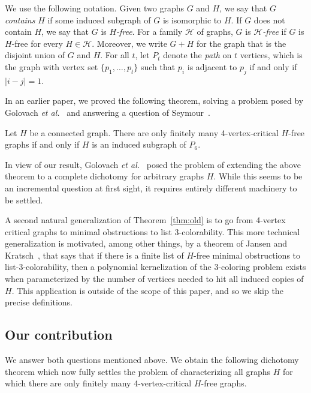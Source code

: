 \documentclass[11pt]{article}
\begin{document}
We use the following notation. Given two graphs $G$ and $H$, we say that
$G$ {\em contains} $H$ if some induced subgraph of $G$ is isomorphic to $H$.
If $G$ does not contain $H$, we say that $G$ is {\em $H$-free}.
For a family $\mathcal{H}$ of graphs, $G$ is {\em $\mathcal{H}$-free}
if $G$ is $H$-free for every $H \in \mathcal{H}$.
Moreover, we write $G+H$ for the graph that is the disjoint union of $G$ and 
$H$.
For all $t$, let $P_t$ denote the {\em path} on $t$ vertices, which is the graph with vertex set $\{p_1, \ldots, p_t\}$ such that $p_i$ is adjacent to $p_j$ if 
and only if $|i-j|=1$.

In an earlier paper, we proved the following theorem, solving a problem posed by Golovach \emph{et al.}~\cite{GJPS15} and answering a question of Seymour~\cite{SeyPriv}.

\begin{theorem}\label{thm:old}
Let $H$ be a connected graph.
There are only finitely many 4-vertex-critical $H$-free graphs if and only if $H$ is an induced subgraph of $P_6$.
\end{theorem}

In view of our result, Golovach \emph{et al.}~\cite{GJPS15} posed the problem of extending the above theorem to a complete dichotomy for arbitrary graphs $H$.
While this seems to be an incremental question at first sight, it requires 
entirely different machinery to be settled.


A second natural generalization of Theorem~\ref{thm:old} is to go from 4-vertex critical graphs to minimal obstructions to list 3-colorability.
This more technical generalization is motivated, among other things, by
a theorem of Jansen and Kratsch~\cite{JK13}, that 
says that if there is a finite list of $H$-free minimal obstructions  to list-3-colorability, then a polynomial kernelization of the 3-coloring problem exists when parameterized by the number of vertices needed to hit all induced copies of $H$. This application is outside of the scope of this paper, and so we skip the precise definitions.

\subsection{Our contribution}

We answer both questions mentioned above.
We obtain the following dichotomy theorem which now fully settles the problem of characterizing all graphs $H$ for which there are only finitely many 4-vertex-critical $H$-free graphs.
\end{document}
